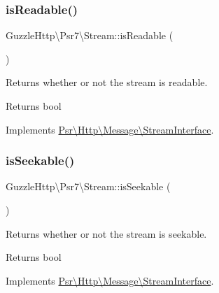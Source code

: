 \subsubsection{\texorpdfstring{is\+Readable()}{isReadable()}}
{\footnotesize\ttfamily Guzzle\+Http\textbackslash{}\+Psr7\textbackslash{}\+Stream\+::is\+Readable (\begin{DoxyParamCaption}{ }\end{DoxyParamCaption})}

Returns whether or not the stream is readable.

\begin{DoxyReturn}{Returns}
bool 
\end{DoxyReturn}


Implements \hyperlink{interfacePsr_1_1Http_1_1Message_1_1StreamInterface_aecf78407aa241622ae200a9faa471d32}{Psr\textbackslash{}\+Http\textbackslash{}\+Message\textbackslash{}\+Stream\+Interface}.

\mbox{\label{classGuzzleHttp_1_1Psr7_1_1Stream_a9c550016f44e763b6acc5b6be865b3f6}} 
\subsubsection{\texorpdfstring{is\+Seekable()}{isSeekable()}}
{\footnotesize\ttfamily Guzzle\+Http\textbackslash{}\+Psr7\textbackslash{}\+Stream\+::is\+Seekable (\begin{DoxyParamCaption}{ }\end{DoxyParamCaption})}

Returns whether or not the stream is seekable.

\begin{DoxyReturn}{Returns}
bool 
\end{DoxyReturn}


Implements \hyperlink{interfacePsr_1_1Http_1_1Message_1_1StreamInterface_ad4a27548fd51bd12390d798981a1622b}{Psr\textbackslash{}\+Http\textbackslash{}\+Message\textbackslash{}\+Stream\+Interface}.

\mbox{\label{classGuzzleHttp_1_1Psr7_1_1Stream_a12a133d09c80a10b63d5194dcbb6be95}} 
